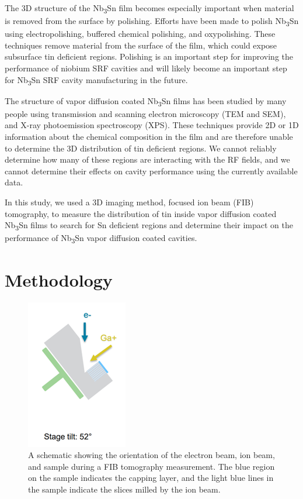 The 3D structure of the Nb\textsubscript{3}Sn film becomes especially important when material is removed from the surface by polishing. Efforts have been made to polish Nb\textsubscript{3}Sn using electropolishing\cite{hu2019reducing}, buffered chemical polishing\cite{hu2019reducing}, and oxypolishing\cite{pudasaini2018studies}. These techniques remove material from the surface of the film, which could expose subsurface tin deficient regions. Polishing is an important step for improving the performance of niobium SRF cavities and will likely become an important step for Nb\textsubscript{3}Sn SRF cavity manufacturing in the future. 

The structure of vapor diffusion coated Nb\textsubscript{3}Sn films has been studied by many people using transmission and scanning electron microscopy (TEM and SEM)\cite{lee2018atomic,becker2015analysis,hall2017surface,hall2016surface}, and X-ray photoemission spectroscopy (XPS)\cite{pudasaini2019growth,sun2019fast,hall2016surface}. These techniques provide 2D or 1D information about the chemical composition in the film and are therefore unable to determine the 3D distribution of tin deficient regions. We cannot reliably determine how many of these regions are interacting with the RF fields, and we cannot determine their effects on cavity performance using the currently available data. 

In this study, we used a 3D imaging method, focused ion beam (FIB) tomography, to measure the distribution of tin inside vapor diffusion coated Nb\textsubscript{3}Sn films to search for Sn deficient regions and determine their impact on the performance of Nb\textsubscript{3}Sn vapor diffusion coated cavities.

\section{Methodology}

\begin{figure}[htb]%
    \centering%
    \includegraphics[width=0.25\columnwidth]{../figs/Figure-1.png}%
    \caption{A schematic showing the orientation of the electron beam, ion beam, and sample during a FIB tomography measurement. The blue region on the sample indicates the capping layer, and the light blue lines in the sample indicate the slices milled by the ion beam.}%
    \label{fig:1}%
\end{figure}


